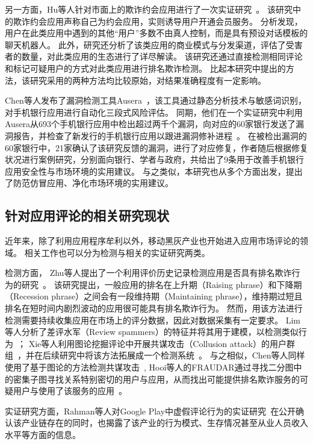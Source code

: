 另一方面，Hu等人针对市面上的欺诈约会应用进行了一次实证研究~\cite{hu2019dating}。
该研究中的欺诈约会应用声称自己为约会应用，实则诱导用户开通会员服务。
分析发现，用户在此类应用中遇到的其他``用户''多数不由真人控制，而是具有预设对话模板的聊天机器人。
此外，研究还分析了该类应用的商业模式与分发渠道，评估了受害者的数量，对此类应用的生态进行了详尽解读。
该研究还通过直接检测相同评论和标记可疑用户的方式对此类应用进行排名欺诈检测。
比起本研究中提出的方法，该研究采用的两种方法均比较原始，对结果准确程度有一定影响。

Chen等人发布了漏洞检测工具Ausera~\cite{chen2018ausera}，该工具通过静态分析技术与敏感词识别，对手机银行应用进行自动化三段式风险评估。
同期，他们在一个实证研究中利用Ausera从693个手机银行应用中检出超过两千个漏洞，向对应的60家银行发送了漏洞报告，并检查了新发行的手机银行应用以跟进漏洞修补进程~\cite{chen2018mobile}。
在被检出漏洞的60家银行中，21家确认了该研究反馈的漏洞，进行了对应修复，作者随后根据修复状况进行案例研究，分别面向银行、学者与政府，共给出了9条用于改善手机银行应用安全性与市场环境的实用建议。
与之类似，本研究也从多个方面出发，提出了防范仿冒应用、净化市场环境的实用建议。

\subsection{针对应用评论的相关研究现状}
近年来，除了利用应用程序牟利以外，移动黑灰产业也开始进入应用市场评论的领域。
相关工作也可以分为检测与相关的实证研究两类。

检测方面，
Zhu等人提出了一个利用评价历史记录检测应用是否具有排名欺诈行为的研究~\cite{zhu2014discovery}。
该研究提出，一般应用的排名在上升期（Raising phrase）和下降期（Recession phrase）之间会有一段维持期（Maintaining phrase），维持期过短且排名在短时间内剧烈波动的应用很可能具有排名欺诈行为。
然而，用该方法进行检测需要持续收集应用在市场上的评分数据，因此对数据采集有一定要求。
Lim等人分析了差评水军（Review spammers）的特征并将其用于建模，以检测类似行为~\cite{lim2010detecting}；
Xie等人利用图论挖掘评论中开展共谋攻击（Collusion attack）的用户群组~\cite{xie2014grouptie}，并在后续研究中将该方法拓展成一个检测系统~\cite{xie2016you}。
与之相似，Chen等人同样使用了基于图论的方法检测共谋攻击~\cite{chen2017toward},
Hooi等人的FRAUDAR通过寻找二分图中的密集子图寻找关系特别密切的用户与应用，从而找出可能提供排名欺诈服务的可疑用户与使用了该服务的应用~\cite{hooi2016fraudar}。

实证研究方面，Rahman等人对Google Play中虚假评论行为的实证研究~\cite{rahman2019art}在公开确认该产业链存在的同时，也揭露了该产业的行为模式、生存情况甚至从业人员收入水平等方面的信息。

